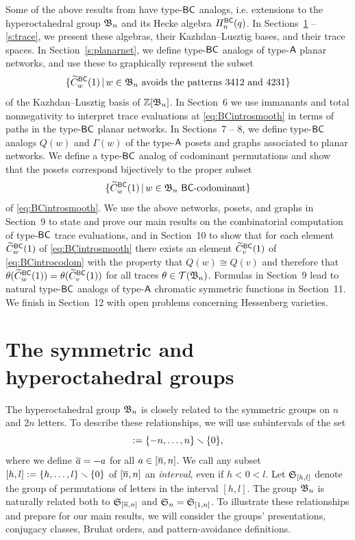 \documentclass[11pt]{article}
\theoremstyle{definition}
\numberwithin{equation}{section}
\begin{document}
Some of the above results
from \cite{CHSSkanEKL, SkanNNDCB, SkanCCS}
have type-$\mathsf{BC}$ analogs,
i.e. extensions to the hyperoctahedral group $\mathfrak{B}_n$
and its Hecke algebra $H_n^{\mathsf{BC}}(q)$.
In Sections~\ref{s:s2nbn} -- \ref{s:trace},
we present these algebras, their Kazhdan--Lusztig bases,
and their trace spaces.
In Section~\ref{s:planarnet}, we define type-$\mathsf{BC}$ analogs
of type-$\mathsf{A}$ planar networks, and use these to
graphically represent the subset
\begin{equation}\label{eq:BCintrosmooth}
  \{ \btc w1 \,|\, w \in \bn \text{ \avoidsp} \}
\end{equation}
of the Kazhdan--Lusztig basis of $\mathbb{Z}[\mathfrak{B}_n]$.
In Section~6 we use immanants and total nonnegativity
to interpret trace evaluations at \eqref{eq:BCintrosmooth}
in terms of paths in the type-$\mathsf{BC}$ planar networks. 
In Sections~7 -- 8, we define type-$\mathsf{BC}$ analogs
$Q(w)$ and $\Gamma(w)$ of the type-$\mathsf{A}$ posets and graphs
associated to planar networks.
We define a type-$\mathsf{BC}$ analog of codominant permutations and
show that the posets correspond bijectively to the proper subset
\begin{equation}\label{eq:BCintrocodom}
  \{ \btc w1 \,|\, w \in \bn \text{ $\msfBC$-codominant} \}
\end{equation}
of \eqref{eq:BCintrosmooth}.
We use the above networks, posets, and graphs 
in Section~9
to state and prove our main results on
the combinatorial computation of type-$\mathsf{BC}$ trace evaluations,
and in Section~10 to show that
for each element $\widetilde{C}_{w}^{\mathsf{BC}}(1)$ of \eqref{eq:BCintrosmooth}
there exists an element $\widetilde{C}_{v}^{\mathsf{BC}}(1)$ of \eqref{eq:BCintrocodom}
with the property that $Q(w) \cong Q(v)$
and therefore that $\theta(\widetilde{C}_{w}^{\mathsf{BC}}(1)) = \theta(\widetilde{C}_{v}^{\mathsf{BC}}(1))$ for all traces
$\theta \in \mathcal{T}(\mathfrak{B}_n)$.
Formulas in Section~9 lead to natural 
type-$\mathsf{BC}$ analogs of
type-$\mathsf{A}$ chromatic symmetric functions 
in Section~11.
We finish in Section~12
with open problems concerning Hessenberg varieties.

\section{The symmetric and hyperoctahedral groups}\label{s:s2nbn}

The hyperoctahedral group $\mathfrak{B}_n$ is closely related to the symmetric
groups on $n$ and $2n$ letters.  To describe these relationships,
we will use 
subintervals of the set
\begin{equation*}
  [\ol n, n] \defeq \{ -n, \dotsc, n \} \ssm \{ 0 \},
  \end{equation*}
where we define
$\overline{a} = -a$ for all $a \in [\overline{n},n]$.
We call any
subset
$[h,l] := \{ h, \dotsc, l \} \smallsetminus \{0 \}$ of $[\overline{n},n]$
an {\em interval}, even if $h < 0 < l$.
Let $\mathfrak{S}_{[h,l]}$ denote
the group of permutations of letters in the interval $[h,l]$.
The group $\mathfrak{B}_n$ is naturally related both to $\mathfrak{S}_{\smash{[\overline{n}, n]}}$
and $\mathfrak{S}_n = \mathfrak{S}_{[1,n]}$.
To illustrate these relationships and prepare for our main results,
we will consider the groups' presentations, conjugacy classes, Bruhat
orders, and pattern-avoidance definitions.
\end{document}
